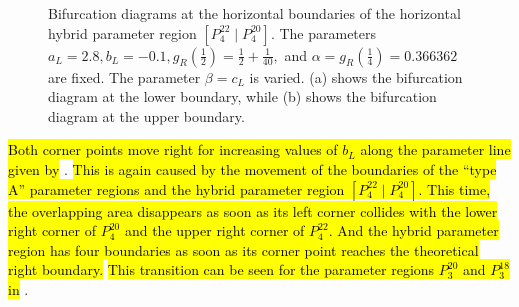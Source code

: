\begin{figure}
	\centering
	\caption[Bifurcation diagrams for the horizontal hybrid parameter regions in the increasing archetypal model]{
		Bifurcation diagrams at the horizontal boundaries of the horizontal hybrid parameter region $\left[P^{22}_4 \mid P^{20}_4\right]$.
		The parameters $a_L = 2.8, b_L = -0.1, g_R\left(\frac{1}{2}\right) = \frac{1}{2} + \frac{1}{40},$ and $\alpha = g_R\left(\frac{1}{4}\right) = 0.366362$ are fixed.
		The parameter $\beta = c_L$ is varied.
		(a) shows the bifurcation diagram at the lower boundary, while (b) shows the bifurcation diagram at the upper boundary.
	}
	\label{fig:add.change.appa.hor.bif}
\end{figure}

\hl{Both corner points move right for increasing values of $b_L$ along the parameter line given by} .
\hl{
	This is again caused by the movement of the boundaries of the ``type A'' parameter regions and the hybrid parameter region $\left[P^{22}_4 \mid P^{20}_4\right]$.
	This time, the overlapping area disappears as soon as its left corner collides with the lower right corner of $P^{20}_4$ and the upper right corner of $P^{22}_4$.
	And the hybrid parameter region has four boundaries as soon as its corner point reaches the theoretical right boundary.
}
\hl{This transition can be seen for the parameter regions $P^{20}_3$ and $P^{18}_3$ in} .

